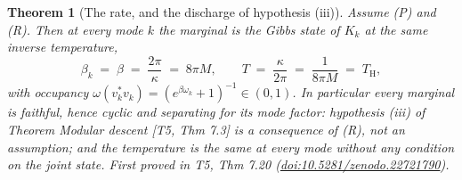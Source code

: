 \documentclass[11pt]{article}
\newtheorem{theorem}{Theorem}[section]
\theoremstyle{definition}
\theoremstyle{plain}
\providecommand{\TH}{}\renewcommand{\TH}{T_{\mathrm{H}}}
\begin{document}
\begin{theorem}[The rate, and the discharge of hypothesis (iii)]\label{c:singularity.rate-discharge-hypothesis-iii}
Assume (P) and (R). Then at every mode $k$ the marginal is the Gibbs state of $K_k$ at the same inverse temperature,
\[
\beta_k \;=\; \beta \;=\; \frac{2\pi}{\kappa} \;=\; 8\pi M , \qquad T \;=\; \frac{\kappa}{2\pi} \;=\; \frac{1}{8\pi M} \;=\; \TH ,
\]
with occupancy $\omega(v_k^{*}v_k) = (e^{\beta\omega_k} + 1)^{-1} \in (0,1)$. In particular every marginal is faithful, hence cyclic and separating for its mode factor: hypothesis (iii) of Theorem \emph{Modular descent} [T5, Thm 7.3] is a consequence of (R), not an assumption; and the temperature is the same at every mode without any condition on the joint state.
\emph{First proved in} T5, Thm 7.20 (\href{https://doi.org/10.5281/zenodo.22721790}{doi:10.5281/zenodo.22721790}).
\end{theorem}
\end{document}
